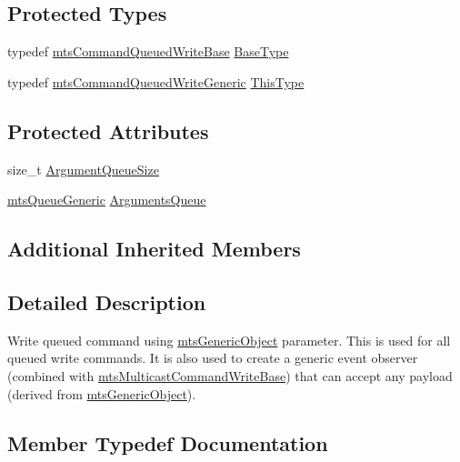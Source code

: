 \subsection*{Protected Types}
\begin{DoxyCompactItemize}
\item 
typedef \hyperlink{classmts_command_queued_write_base}{mts\+Command\+Queued\+Write\+Base} \hyperlink{classmts_command_queued_write_generic_aed493b67ec1386ed63d4cfa04c7d8990}{Base\+Type}
\item 
typedef \hyperlink{classmts_command_queued_write_generic}{mts\+Command\+Queued\+Write\+Generic} \hyperlink{classmts_command_queued_write_generic_a7f9494fd611be623fa3e51a3e12052d6}{This\+Type}
\end{DoxyCompactItemize}
\subsection*{Protected Attributes}
\begin{DoxyCompactItemize}
\item 
size\+\_\+t \hyperlink{classmts_command_queued_write_generic_ad1c8cda6d29a47d37496ed38330530ad}{Argument\+Queue\+Size}
\item 
\hyperlink{classmts_queue_generic}{mts\+Queue\+Generic} \hyperlink{classmts_command_queued_write_generic_aed20ecad144f2e1aa6d26ba37e71e3ea}{Arguments\+Queue}
\end{DoxyCompactItemize}
\subsection*{Additional Inherited Members}


\subsection{Detailed Description}
Write queued command using \hyperlink{classmts_generic_object}{mts\+Generic\+Object} parameter. This is used for all queued write commands. It is also used to create a generic event observer (combined with \hyperlink{classmts_multicast_command_write_base}{mts\+Multicast\+Command\+Write\+Base}) that can accept any payload (derived from \hyperlink{classmts_generic_object}{mts\+Generic\+Object}). 

\subsection{Member Typedef Documentation}
\hypertarget{classmts_command_queued_write_generic_aed493b67ec1386ed63d4cfa04c7d8990}{}
